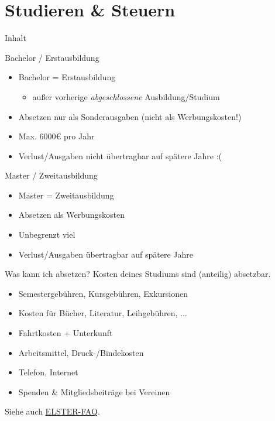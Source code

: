 \documentclass{beamer}
\begin{document}
	\section{Studieren \& Steuern}
	
		\begin{frame}[t]{Inhalt}
		\end{frame}
	
		\begin{frame}{Bachelor / Erstausbildung}
			\begin{itemize}
				\item Bachelor = Erstausbildung
				\begin{itemize}
					\item außer vorherige \textit{abgeschlossene} Ausbildung/Studium
				\end{itemize}
				\item Absetzen nur als Sonderausgaben (nicht als Werbungskosten!)
				\item Max. 6000€ pro Jahr
				\item Verlust/Ausgaben nicht übertragbar auf spätere Jahre :(
			\end{itemize}
		\end{frame}
	
		\begin{frame}{Master / Zweitausbildung}
			\begin{itemize}
				\item Master = Zweitausbildung
				\item Absetzen als Werbungskosten
				\item Unbegrenzt viel
				\item Verlust/Ausgaben übertragbar auf spätere Jahre
			\end{itemize}
		\end{frame}
	
		\begin{frame}{Was kann ich absetzen?}
			Kosten deines Studiums sind (anteilig) absetzbar.\n
			\begin{itemize}
				\item Semestergebühren, Kursgebühren, Exkursionen
				\item Kosten für Bücher, Literatur, Leihgebühren, ...
				\item Fahrtkosten + Unterkunft
				\item Arbeitsmittel, Druck-/Bindekosten
				\item Telefon, Internet
				\item Spenden \& Mitgliedsbeiträge bei Vereinen
			\end{itemize}\n
			Siehe auch \href{https://www.elster.de/eportal/helpGlobal?themaGlobal=help_est_ufa_10_2023\#c9718}{ELSTER-FAQ}.
		\end{frame}
	
\end{document}
